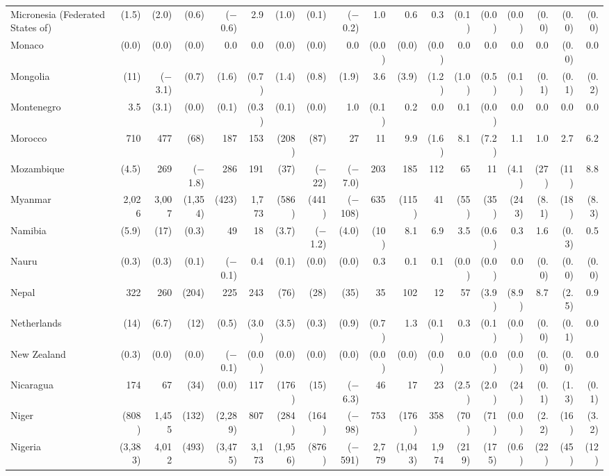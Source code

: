 \begin{longtable}{lrrrrrrrrrrrrrrrrr}
Micronesia (Federated States of) & (1.5) & (2.0) & (0.6) & ($-$0.6) & 2.9 & (1.0) & (0.1) & ($-$0.2) & 1.0 & 0.6 & 0.3 & (0.1) & (0.0) & (0.0) & (0.0) & (0.0) & (0.0) \\
Monaco & (0.0) & (0.0) & (0.0) & 0.0 & 0.0 & (0.0) & (0.0) & 0.0 & (0.0) & (0.0) & (0.0) & 0.0 & 0.0 & 0.0 & 0.0 & (0.0) & 0.0 \\
Mongolia & (11) & ($-$3.1) & (0.7) & (1.6) & (0.7) & (1.4) & (0.8) & (1.9) & 3.6 & (3.9) & (1.2) & (1.0) & (0.5) & (0.1) & (0.1) & (0.1) & (0.2) \\
Montenegro & 3.5 & (3.1) & (0.0) & (0.1) & (0.3) & (0.1) & (0.0) & 1.0 & (0.1) & 0.2 & 0.0 & 0.1 & (0.0) & 0.0 & 0.0 & 0.0 & 0.0 \\
Morocco & 710 & 477 & (68) & 187 & 153 & (208) & (87) & 27 & 11 & 9.9 & (1.6) & 8.1 & (7.2) & 1.1 & 1.0 & 2.7 & 6.2 \\
Mozambique & (4.5) & 269 & ($-$1.8) & 286 & 191 & (37) & ($-$22) & ($-$7.0) & 203 & 185 & 112 & 65 & 11 & (4.1) & (27) & (11) & 8.8 \\
Myanmar & 2,026 & 3,007 & (1,354) & (423) & 1,773 & (586) & (441) & ($-$108) & 635 & (115) & 41 & (55) & (35) & (243) & (8.1) & (18) & (8.3) \\
Namibia & (5.9) & (17) & (0.3) & 49 & 18 & (3.7) & ($-$1.2) & (4.0) & (10) & 8.1 & 6.9 & 3.5 & (0.6) & 0.3 & 1.6 & (0.3) & 0.5 \\
Nauru & (0.3) & (0.3) & (0.1) & ($-$0.1) & 0.4 & (0.1) & (0.0) & (0.0) & 0.3 & 0.1 & 0.1 & (0.0) & (0.0) & 0.0 & (0.0) & (0.0) & (0.0) \\
Nepal & 322 & 260 & (204) & 225 & 243 & (76) & (28) & (35) & 35 & 102 & 12 & 57 & (3.9) & (8.9) & 8.7 & (2.5) & 0.9 \\
Netherlands & (14) & (6.7) & (12) & (0.5) & (3.0) & (3.5) & (0.3) & (0.9) & (0.7) & 1.3 & (0.1) & 0.3 & (0.1) & (0.0) & (0.0) & (0.1) & 0.0 \\
New Zealand & (0.3) & (0.0) & (0.0) & ($-$0.1) & (0.0) & (0.0) & (0.0) & (0.0) & (0.0) & (0.0) & (0.0) & 0.0 & (0.0) & (0.0) & (0.0) & (0.0) & 0.0 \\
Nicaragua & 174 & 67 & (34) & (0.0) & 117 & (176) & (15) & ($-$6.3) & 46 & 17 & 23 & (2.5) & (2.0) & (24) & (0.1) & (1.3) & (0.1) \\
Niger & (808) & 1,455 & (132) & (2,289) & 807 & (284) & (164) & ($-$98) & 753 & (176) & 358 & (70) & (71) & (0.0) & (2.2) & (16) & (3.2) \\
Nigeria & (3,383) & 4,012 & (493) & (3,475) & 3,173 & (1,956) & (876) & ($-$591) & 2,779 & (1,043) & 1,974 & (219) & (175) & (0.6) & (22) & (45) & (12) \\

\end{longtable}
